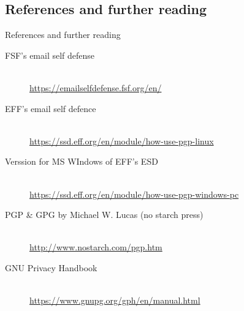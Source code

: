 \documentclass[hyperref={colorlinks=true}]{beamer}
\begin{document}
\subsection{References and further reading}
\begin{frame}{References and further reading}
  \begin{description}
    \item[FSF's email self defense] \hfill \\
\href{https://emailselfdefense.fsf.org/en/}
{https://emailselfdefense.fsf.org/en/}
    \item[EFF's email self defence] \hfill \\
\href{https://ssd.eff.org/en/module/how-use-pgp-linux}
{https://ssd.eff.org/en/module/how-use-pgp-linux}
    \item[Verssion for MS WIndows of EFF's ESD] \hfill \\
\href{https://ssd.eff.org/en/module/how-use-pgp-windows-pc}
{https://ssd.eff.org/en/module/how-use-pgp-windows-pc}
    \item[PGP \& GPG by Michael W. Lucas (no starch press)] \hfill \\
\href{http://www.nostarch.com/pgp.htm}
{http://www.nostarch.com/pgp.htm}
    \item[GNU Privacy Handbook] \hfill \\
\href{https://www.gnupg.org/gph/en/manual.html}
{https://www.gnupg.org/gph/en/manual.html}
  \end{description}
\end{frame}
\end{document}

